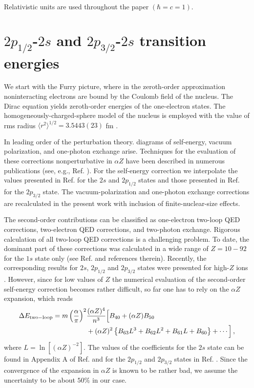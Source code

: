 \documentclass[preprint,aps,pra,showpacs,floatfix]{revtex4}
\newcommand{\la}{\langle}
\newcommand{\ra}{\rangle}
\newcommand{\al}{\alpha}
\newcommand{\az}{\alpha Z}
\begin{document}
Relativistic units are used throughout the paper $(\hbar=c=1)$.
%
%
\section{${2p_{1/2}}$-${2s}$ and ${2p_{3/2}}$-${2s}$ transition energies}
\label{section:en}
%
%

We start with the Furry picture, where in the zeroth-order approximation
noninteracting electrons are bound by the Coulomb field of the nucleus.
The Dirac equation yields zeroth-order energies of the one-electron states.
The homogeneously-charged-sphere model of the nucleus is employed with
the value of rms radius $\la r^2 \ra^{1/2}=3.5443(23)$ fm \cite{ADNDT87_185}.

In leading order of the perturbation theory. diagrams of self-energy,
vacuum polarization, and one-photon exchange arise.
Techniques for the evaluation of these corrections nonperturbative in $\az$
have been described in numerous publications (see, e.g., Ref. \cite{mohr:PREP:98}).
For the self-energy correction we interpolate the values presented in Ref. \cite{PRA58_954}
for the $2s$ and $2p_{1/2}$ states and those presented in Ref. \cite{PRA46_4421}
for the $2p_{3/2}$ state. The vacuum-polarization and one-photon exchange
corrections are recalculated in the present work with inclusion of finite-nuclear-size effects.

The second-order contributions can be classified as one-electron two-loop QED
corrections, two-electron QED corrections, and two-photon exchange. Rigorous
calculation of all two-loop QED corrections is a challenging problem. To date,
the dominant part of these corrections was calculated in a wide range of $Z=10-92$
for the $1s$ state only (see Ref. \cite{yerokhin:SESE} and references therein).
Recently, the corresponding results for $2s$, $2p_{1/2}$ and $2p_{3/2}$ states were
presented for high-$Z$ ions \cite{yerokhin:PRL:06}. However, since for low values
of $Z$ the numerical evaluation of the second-order self-energy correction becomes
rather difficult, so far one has to rely on the $\az$ expansion, which reads
%
\begin{align}
\label{two-loop}
  \Delta E_{\rm two-loop}=m \left( \frac{\al}{\pi} \right)^2 & \frac{(\az)^4}{n^3}
    \Big[
      B_{40} + (\az)B_{50}
\notag\\
      &+ (\az)^2 \left\{ B_{63} L^3 + B_{62} L^2 + B_{61} L + B_{60} \right\} + \cdots
    \Big]
\,,
\end{align}
%
where $L=\ln[(\az)^{-2}]$. The values of the coefficients for the $2s$ state
can be found in Appendix A of Ref. \cite{RPM77_000001} and for the $2p_{1/2}$
and $2p_{3/2}$ states in Ref. \cite{PRA72_062102}. Since the convergence of
the expansion in $\az$ is known to be rather bad, we assume the uncertainty
to be about $50\%$ in our case.
\end{document}
